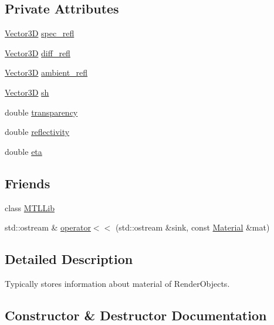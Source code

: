 \subsection*{Private Attributes}
\begin{DoxyCompactItemize}
\item 
\mbox{\hyperlink{classVector3D}{Vector3D}} \mbox{\hyperlink{classMaterial_a8b1858703e3298ba1cc705684939f953}{spec\+\_\+refl}}
\item 
\mbox{\hyperlink{classVector3D}{Vector3D}} \mbox{\hyperlink{classMaterial_af53038fbe5bbe5d1a9801aabc97543a5}{diff\+\_\+refl}}
\item 
\mbox{\hyperlink{classVector3D}{Vector3D}} \mbox{\hyperlink{classMaterial_a40002cba7c7049feb2bddaf57ae96ba4}{ambient\+\_\+refl}}
\item 
\mbox{\hyperlink{classVector3D}{Vector3D}} \mbox{\hyperlink{classMaterial_a886d30c3aaf819eea8f619c5ecc21f92}{sh}}
\item 
double \mbox{\hyperlink{classMaterial_a02abe03436775e128e04e1c737d34067}{transparency}}
\item 
double \mbox{\hyperlink{classMaterial_a050f60e6002271e571c4e5afc4b097b5}{reflectivity}}
\item 
double \mbox{\hyperlink{classMaterial_a62e8368c76c975790315b16d97558c26}{eta}}
\end{DoxyCompactItemize}
\subsection*{Friends}
\begin{DoxyCompactItemize}
\item 
class \mbox{\hyperlink{classMaterial_aa4d43ed50061aeb4600daf1e3f7706ac}{M\+T\+L\+Lib}}
\item 
std\+::ostream \& \mbox{\hyperlink{classMaterial_acf2af134f767709233736d54356180be}{operator$<$$<$}} (std\+::ostream \&sink, const \mbox{\hyperlink{classMaterial}{Material}} \&mat)
\end{DoxyCompactItemize}


\subsection{Detailed Description}
Typically stores information about material of Render\+Objects. 

\subsection{Constructor \& Destructor Documentation}
\mbox{\label{classMaterial_a4e63e7e70f9a2cc55801f798d88f5c14}} 
